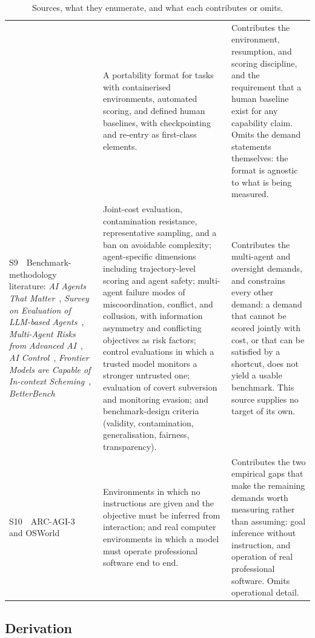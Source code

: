 \begin{table}[h]
\begin{tabular}{@{}>{\raggedright\arraybackslash}p{}>{\raggedright\arraybackslash}p{}>{\raggedright\arraybackslash}p{}@{}}
& A portability format for tasks with containerised environments, automated scoring, and defined human baselines, with checkpointing and re-entry as first-class elements.
& Contributes the environment, resumption, and scoring discipline, and the requirement that a human baseline exist for any capability claim. Omits the demand statements themselves: the format is agnostic to what is being measured. \\
S9~~Benchmark-methodology literature: \emph{AI Agents That Matter}~\citep{kapoor2024agentsmatter}, \emph{Survey on Evaluation of LLM-based Agents}~\citep{yehudai2025agentsurvey}, \emph{Multi-Agent Risks from Advanced AI}~\citep{hammond2025multiagent}, \emph{AI Control}~\citep{greenblatt2024aicontrol}, \emph{Frontier Models are Capable of In-context Scheming}~\citep{meinke2024scheming}, \emph{BetterBench}~\citep{reuel2024betterbench}
& Joint-cost evaluation, contamination resistance, representative sampling, and a ban on avoidable complexity; agent-specific dimensions including trajectory-level scoring and agent safety; multi-agent failure modes of miscoordination, conflict, and collusion, with information asymmetry and conflicting objectives as risk factors; control evaluations in which a trusted model monitors a stronger untrusted one; evaluation of covert subversion and monitoring evasion; and benchmark-design criteria (validity, contamination, generalisation, fairness, transparency).
& Contributes the multi-agent and oversight demands, and constrains every other demand: a demand that cannot be scored jointly with cost, or that can be satisfied by a shortcut, does not yield a usable benchmark. This source supplies no target of its own. \\
S10~~ARC-AGI-3~\citep{arc-agi-3} and OSWorld~\citep{xie2024osworld}
& Environments in which no instructions are given and the objective must be inferred from interaction; and real computer environments in which a model must operate professional software end to end.
& Contributes the two empirical gaps that make the remaining demands worth measuring rather than assuming: goal inference without instruction, and operation of real professional software. Omits operational detail. \\
\bottomrule
\end{tabular}
\caption{Sources, what they enumerate, and what each contributes or omits.}
\label{tab:sources}
\end{table}

\subsection{Derivation}

